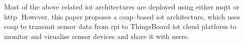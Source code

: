 Most of the above related \gls{iot} architectures are deployed 
using either \gls{mqtt} or \gls{http}.
However, this paper proposes a \gls{coap}--based \gls{iot} architecture, 
which uses \gls{coap} to transmit sensor data from \gls{rpi} 
to ThingsBoard \gls{iot} cloud platform to monitor and 
visualise sensor devices and share it with users.